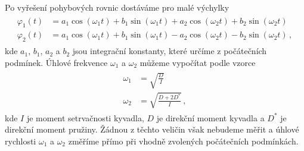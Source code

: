 Po vyřešení pohybových rovnic dostáváme pro malé výchylky \cite{ZFP}
\begin{align}
\label{eq::phiobecne}
\begin{split}
 \varphi _1(t) &= a_1 \cos (\omega _1 t) + b_1 \sin (\omega _1 t) + a_2 \cos (\omega_2 t) + b_2 \sin(\omega_2 t)
\\
 \varphi _2(t) &= a_1 \cos (\omega _1 t) + b_1 \sin (\omega _1 t) - a_2 \cos (\omega_2 t) - b_2 \sin(\omega_2 t) \,,
\end{split}
\end{align}
kde $a_1$, $b_1$, $a_2$ a $b_2$ jsou integrační konstanty, které určíme z počátečních podmínek.
Úhlové frekvence $\omega _1$ a $\omega _2$ můžeme vypočítat podle vzorce \cite{ZFP}
\begin{align}
\label{eq::omegadirekcni}
\begin{split}
 \omega_1 &= \sqrt{\frac{D}{I}}
\\
 \omega_2 &= \sqrt{\frac{D+2D^{\ast}}{I}} \,,
\end{split}
\end{align}
kde $I$ je moment setrvačnosti kyvadla, $D$ je direkční moment kyvadla a $D^{\ast}$ je direkční moment pružiny. Žádnou z těchto veličin však nebudeme měřit a úhlové rychlosti $\omega _1$ a $\omega _2$ změříme přímo při vhodně zvolených počátečních podmínkách.

